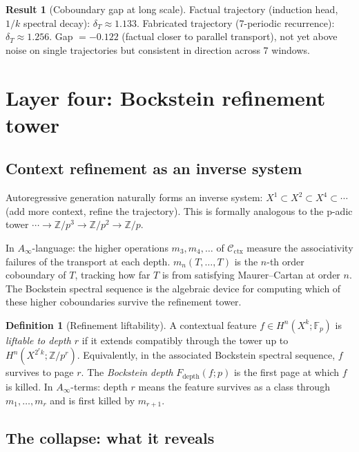 \documentclass[11pt]{amsart}
\theoremstyle{definition}
\newtheorem{definition}[theorem]{Definition}
\newtheorem{result}[theorem]{Result}
\newcommand{\Cctx}{\mathcal{C}_{\!\mathrm{ctx}}}
\newcommand{\Z}{\mathbb{Z}}
\newcommand{\Fp}{\mathbb{F}_p}
\newcommand{\cobdry}{\delta}
\begin{document}
\begin{result}[Coboundary gap at long scale]
\label{result:cobdry}
Factual trajectory (induction head, $1/k$ spectral decay):
$\cobdry_T \approx 1.133$.
Fabricated trajectory (7-periodic recurrence):
$\cobdry_T \approx 1.256$.
Gap $= -0.122$ (factual closer to parallel transport), not yet above noise
on single trajectories but consistent in direction across 7 windows.
\end{result}

\section{Layer four: Bockstein refinement tower}
\label{sec:bockstein}

\subsection{Context refinement as an inverse system}

Autoregressive generation naturally forms an inverse system:
$X^1 \subset X^2 \subset X^4 \subset \cdots$
(add more context, refine the trajectory).
This is formally analogous to the p-adic tower
$\cdots \to \Z/p^3 \to \Z/p^2 \to \Z/p$.

In $A_\infty$-language: the higher operations $m_3, m_4, \ldots$ of
$\Cctx$ measure the associativity failures of the transport
at each depth.
$m_n(T, \ldots, T)$ is the $n$-th order coboundary of $T$,
tracking how far $T$ is from satisfying Maurer--Cartan at order $n$.
The Bockstein spectral sequence is the algebraic device for
computing which of these higher coboundaries survive the refinement tower.

\begin{definition}[Refinement liftability]
A contextual feature $f \in H^n(X^k; \Fp)$ is
\emph{liftable to depth $r$} if it extends compatibly through the
tower up to $H^n(X^{2^r k}; \Z/p^r)$.
Equivalently, in the associated Bockstein spectral sequence,
$f$ survives to page $r$.
The \emph{Bockstein depth} $F_{\mathrm{depth}}(f; p)$ is the
first page at which $f$ is killed.
In $A_\infty$-terms: depth $r$ means the feature survives
as a class through $m_1, \ldots, m_r$ and is first killed by $m_{r+1}$.
\end{definition}

\subsection{The collapse: what it reveals}
\end{document}
